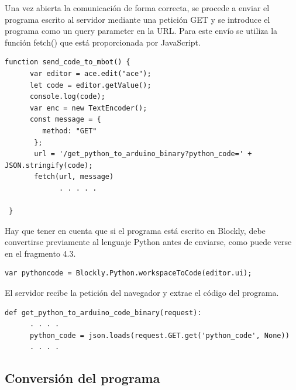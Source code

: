 \documentclass{report}
\begin{document}
Una vez abierta la comunicación de forma correcta, se procede a enviar el programa escrito al servidor mediante una petición GET y se introduce el programa como un query parameter en la URL. Para este envío se utiliza la función fetch() que está proporcionada por JavaScript.
\\
\begin{lstlisting}[frame=single,breaklines=true, label=Envio del programa desde el navegador al servidor, caption=Envio del programa desde el navegador al servidor, captionpos=b]
   function send_code_to_mbot() {
      var editor = ace.edit("ace");
      let code = editor.getValue();
      console.log(code);
      var enc = new TextEncoder();
      const message = {
         method: "GET"
       };
       url = '/get_python_to_arduino_binary?python_code=' + JSON.stringify(code);
       fetch(url, message)
             . . . . .
  
 }
\end{lstlisting}
Hay que tener en cuenta que si el programa está escrito en Blockly, debe convertirse previamente al lenguaje Python antes de enviarse, como puede verse en el fragmento 4.3.
\\
\begin{lstlisting}[frame=single,breaklines=true, label=Conversión de Blockly a Python, caption=Conversión de Blockly a Python, captionpos=b]
   var pythoncode = Blockly.Python.workspaceToCode(editor.ui);
\end{lstlisting}
El servidor recibe la petición del navegador y extrae el código del programa.
\\
\begin{lstlisting}[frame=single,breaklines=true, label=Extracción del programa en el servidor, caption=Extracción programa en el servidor, captionpos=b]
   def get_python_to_arduino_code_binary(request):
      . . . .
      python_code = json.loads(request.GET.get('python_code', None))
      . . . .

\end{lstlisting}

\subsection{Conversión del programa}
\end{document}
